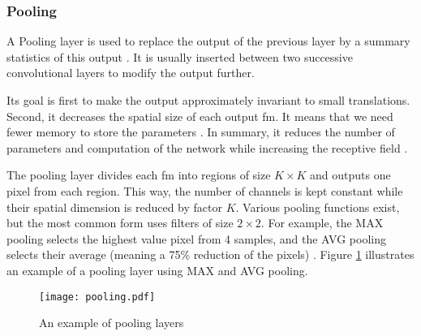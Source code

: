 \subsubsection{Pooling} \label{subs:pooling}
A Pooling layer is used to replace the output of the previous layer by a summary statistics of this output \cite{goodfellow_deep_2016}. It is usually inserted between two successive convolutional layers to modify the output further. 

Its goal is first to make the output approximately invariant to small translations. Second, it decreases the spatial size of each output \acrshort{fm}. It means that we need fewer memory to store the parameters \cite{goodfellow_deep_2016}. In summary, it reduces the number of parameters and  computation of the network while increasing the receptive field \cite{shawahna_fpga-based_2019, matteucci_artificial_2019}.

The pooling layer divides each \acrshort{fm} into regions of size $K \times K$ and outputs one pixel from each region. This way, the number of channels is kept constant while their spatial dimension is reduced by factor $K$. Various pooling functions exist, but the most common form uses filters of size $2 \times 2$. For example, the MAX pooling selects the highest value pixel from 4 samples, and the AVG pooling selects their average (meaning a 75\% reduction of the pixels) \cite{suda_throughput-optimized_2016}. Figure \ref{fig:pool} illustrates an example of a pooling layer using MAX and AVG pooling.
%
\begin{figure}[H]
    \centering
    \texttt{[image: pooling.pdf]}
    \caption{An example of pooling layers}
    \label{fig:pool}
\end{figure}